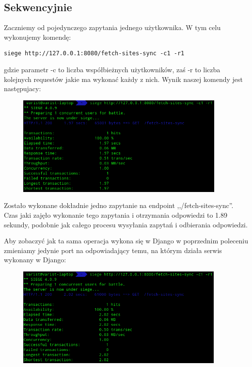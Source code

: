 \subsection{Sekwencyjnie}
Zaczniemy od pojedynczego zapytania jednego użytkownika. W tym celu wykonujemy komendę:
\begin{lstlisting}
siege http://127.0.0.1:8080/fetch-sites-sync -c1 -r1
\end{lstlisting}
gdzie parametr -c to liczba współbieżnych użytkowników, zaś -r to liczba kolejnych requestów jakie ma wykonać każdy z nich. Wynik naszej komendy jest następujacy:
\begin{figure}[H]
    \includegraphics[height=50mm]{zdjecia/1_req_sync_fast}
    \centering
\end{figure}
Zostało wykonane dokładnie jedno zapytanie na endpoint ,,/fetch-sites-sync''. Czas jaki zajęło wykonanie tego zapytania i otrzymania odpowiedzi to 1.89 sekundy, podobnie jak całego procesu wysyłania zapytań i odbierania odpowiedzi.

Aby zobaczyć jak ta sama operacja wykona się w Django w poprzednim poleceniu zmieniamy jedynie port na odpowiadający temu, na którym działa serwis wykonany w Django:
\begin{figure}[H]
    \includegraphics[height=50mm]{zdjecia/1_req_sync_django}
    \centering
\end{figure}

